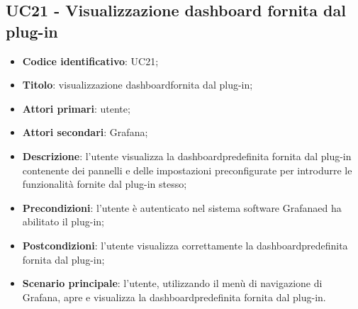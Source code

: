 \subsection{UC21 - Visualizzazione dashboard fornita dal plug-in}
\begin{itemize}
	\item \textbf{Codice identificativo}: UC21;
	\item \textbf{Titolo}: visualizzazione dashboard\glosp fornita dal plug-in;
	\item \textbf{Attori primari}: utente;
	\item \textbf{Attori secondari}: Grafana\glo;
	\item \textbf{Descrizione}: l'utente visualizza la dashboard\glosp predefinita fornita dal plug-in contenente dei pannelli e delle impostazioni preconfigurate per introdurre le funzionalità fornite dal plug-in stesso;
	\item \textbf{Precondizioni}: l'utente è autenticato nel sistema software Grafana\glosp ed ha abilitato il plug-in;
	\item \textbf{Postcondizioni}: l'utente visualizza correttamente la dashboard\glosp predefinita fornita dal plug-in;
	\item \textbf{Scenario principale}: l'utente, utilizzando il menù di navigazione di Grafana\glo, apre e visualizza la dashboard\glosp predefinita fornita dal plug-in.
\end{itemize} 
